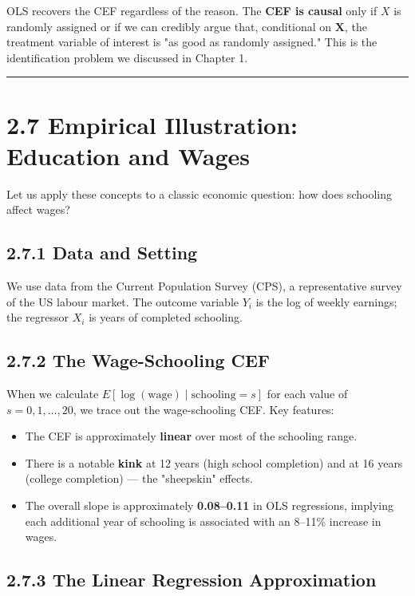 OLS recovers the CEF regardless of the reason. The \textbf{CEF is causal} only if $X$ is randomly assigned or if we can credibly argue that, conditional on $\mathbf{X}$, the treatment variable of interest is "as good as randomly assigned." This is the identification problem we discussed in Chapter 1.

\medskip\hrule\medskip

\section{2.7 Empirical Illustration: Education and Wages}

Let us apply these concepts to a classic economic question: how does schooling affect wages?

\subsection{2.7.1 Data and Setting}

We use data from the Current Population Survey (CPS), a representative survey of the US labour market. The outcome variable $Y_i$ is the log of weekly earnings; the regressor $X_i$ is years of completed schooling.

\subsection{2.7.2 The Wage-Schooling CEF}

When we calculate $E[\log(\text{wage}) \mid \text{schooling} = s]$ for each value of $s = 0, 1, \ldots, 20$, we trace out the wage-schooling CEF. Key features:

\begin{itemize}
\item The CEF is approximately \textbf{linear} over most of the schooling range.
\item There is a notable \textbf{kink} at 12 years (high school completion) and at 16 years (college completion) --- the "sheepskin" effects.
\item The overall slope is approximately \textbf{0.08--0.11} in OLS regressions, implying each additional year of schooling is associated with an 8--11\% increase in wages.
\end{itemize}

\subsection{2.7.3 The Linear Regression Approximation}

